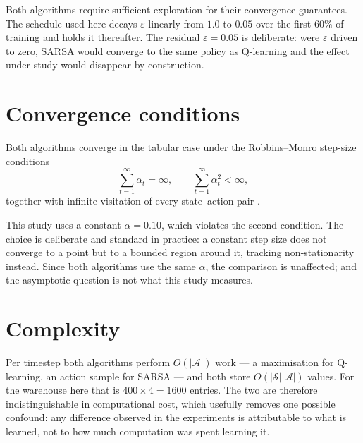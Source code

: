 Both algorithms require sufficient exploration for their convergence guarantees. The schedule used
here decays $\varepsilon$ linearly from $1.0$ to $0.05$ over the first 60\% of training and holds
it thereafter. The residual $\varepsilon = 0.05$ is deliberate: were $\varepsilon$ driven to zero,
SARSA would converge to the same policy as Q-learning and the effect under study would disappear
by construction.

\section{Convergence conditions}

Both algorithms converge in the tabular case under the Robbins--Monro step-size conditions
\begin{equation}
\sum_{t=1}^{\infty} \alpha_t = \infty, \qquad \sum_{t=1}^{\infty} \alpha_t^{2} < \infty,
\end{equation}
together with infinite visitation of every state--action pair
\cite{watkins1992,jaakkola1994,singh2000}.

This study uses a constant $\alpha = 0.10$, which violates the second condition. The choice is
deliberate and standard in practice: a constant step size does not converge to a point but to a
bounded region around it, tracking non-stationarity instead. Since both algorithms use the same
$\alpha$, the comparison is unaffected; and the asymptotic question is not what this study
measures.

\section{Complexity}

Per timestep both algorithms perform $O(|\mathcal{A}|)$ work --- a maximisation for Q-learning, an
action sample for SARSA --- and both store $O(|\mathcal{S}||\mathcal{A}|)$ values. For the
warehouse here that is $400 \times 4 = 1600$ entries. The two are therefore indistinguishable in
computational cost, which usefully removes one possible confound: any difference observed in the
experiments is attributable to what is learned, not to how much computation was spent learning it.
